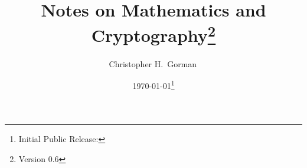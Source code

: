 
\newcommand*{\Author}[0]{Christopher H.~Gorman}
\newcommand*{\Title}[0]{Notes on Mathematics and Cryptography}






\author{\Author{}\,}
\title{\Title{}\thanks{Version 0.6}}
\date{\today\thanks{Initial Public Release: }}


